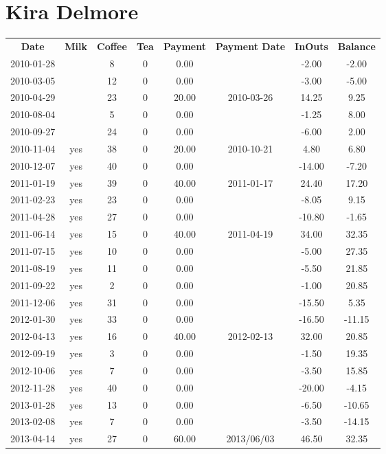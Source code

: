 \section{Kira Delmore}

\begin{center}
\begin{tabular}{cccccccc}
\textbf{Date} & \textbf{Milk} & \textbf{Coffee} & \textbf{Tea} & \textbf{Payment} & \textbf{Payment Date} & \textbf{InOuts} & \textbf{Balance} \\
2010-01-28 &  &  8 & 0 &  0.00 &  &  -2.00 &  -2.00\\ 
2010-03-05 &  & 12 & 0 &  0.00 &  &  -3.00 &  -5.00\\ 
2010-04-29 &  & 23 & 0 & 20.00 & 2010-03-26 &  14.25 &   9.25\\ 
2010-08-04 &  &  5 & 0 &  0.00 &  &  -1.25 &   8.00\\ 
2010-09-27 &  & 24 & 0 &  0.00 &  &  -6.00 &   2.00\\ 
2010-11-04 & yes & 38 & 0 & 20.00 & 2010-10-21 &   4.80 &   6.80\\ 
2010-12-07 & yes & 40 & 0 &  0.00 &  & -14.00 &  -7.20\\ 
2011-01-19 & yes & 39 & 0 & 40.00 & 2011-01-17 &  24.40 &  17.20\\ 
2011-02-23 & yes & 23 & 0 &  0.00 &  &  -8.05 &   9.15\\ 
2011-04-28 & yes & 27 & 0 &  0.00 &  & -10.80 &  -1.65\\ 
2011-06-14 & yes & 15 & 0 & 40.00 & 2011-04-19 &  34.00 &  32.35\\ 
2011-07-15 & yes & 10 & 0 &  0.00 &  &  -5.00 &  27.35\\ 
2011-08-19 & yes & 11 & 0 &  0.00 &  &  -5.50 &  21.85\\ 
2011-09-22 & yes &  2 & 0 &  0.00 &  &  -1.00 &  20.85\\ 
2011-12-06 & yes & 31 & 0 &  0.00 &  & -15.50 &   5.35\\ 
2012-01-30 & yes & 33 & 0 &  0.00 &  & -16.50 & -11.15\\ 
2012-04-13 & yes & 16 & 0 & 40.00 & 2012-02-13 &  32.00 &  20.85\\ 
2012-09-19 & yes &  3 & 0 &  0.00 &  &  -1.50 &  19.35\\ 
2012-10-06 & yes &  7 & 0 &  0.00 &  &  -3.50 &  15.85\\ 
2012-11-28 & yes & 40 & 0 &  0.00 &  & -20.00 &  -4.15\\ 
2013-01-28 & yes & 13 & 0 &  0.00 &  &  -6.50 & -10.65\\ 
2013-02-08 & yes &  7 & 0 &  0.00 &  &  -3.50 & -14.15\\ 
2013-04-14 & yes & 27 & 0 & 60.00 & 2013/06/03 &  46.50 &  32.35
\end{tabular}
\end{center}

